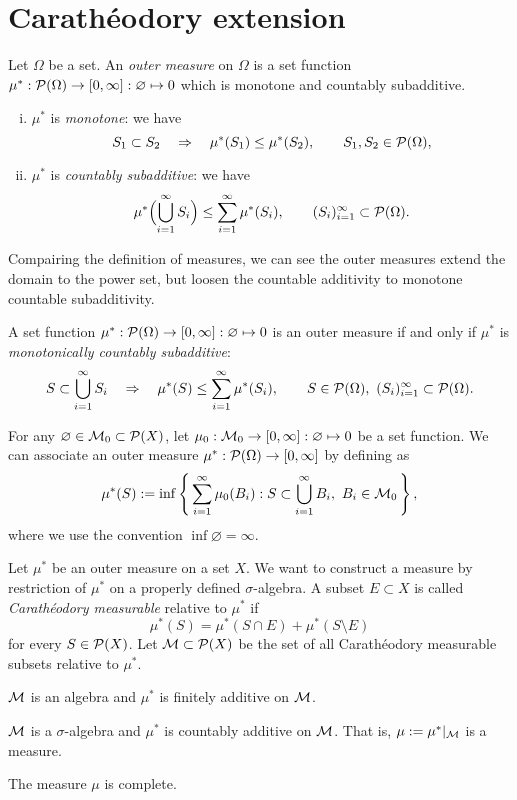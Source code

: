 \documentclass{../../large}
\begin{document}
\section{Carath\'eodory extension}

\begin{prb}
Let $\Omega$ be a set.
An \emph{outer measure} on $\Omega$ is a set function $\mu^*:\mathcal{P}(\Omega)\to[0,\infty]:\varnothing\mapsto0$ which is monotone and countably subadditive.
\begin{enumerate}[(i)]
\item $\mu^*$ is \emph{monotone}: we have
\[S_1\subset S_2\quad\Rightarrow\quad\mu^*(S_1)\le\mu^*(S_2),\qquad S_1,S_2\in\mathcal{P}(\Omega),\]
\item $\mu^*$ is \emph{countably subadditive}: we have
\[\mu^*\Bigl(\bigcup_{i=1}^\infty S_i\Bigr)\le\sum_{i=1}^\infty\mu^*(S_i),\qquad (S_i)_{i=1}^\infty\subset\mathcal{P}(\Omega).\]
\end{enumerate}
Compairing the definition of measures, we can see the outer measures extend the domain to the power set, but loosen the countable additivity to monotone countable subadditivity.
\begin{parts}
\item A set function $\mu^*:\mathcal{P}(\Omega)\to[0,\infty]:\varnothing\mapsto0$ is an outer measure if and only if $\mu^*$ is \emph{monotonically countably subadditive}:
\[S\subset\bigcup_{i=1}^\infty S_i\quad\Rightarrow\quad\mu^*(S)\le\sum_{i=1}^\infty\mu^*(S_i),\qquad S\in\mathcal{P}(\Omega),\ (S_i)_{i=1}^\infty\subset\mathcal{P}(\Omega).\]
\item
For any $\varnothing\in\mathcal{M}_0\subset\mathcal{P}(X)$, let $\mu_0:\mathcal{M}_0\to[0,\infty]:\varnothing\mapsto0$ be a set function.
We can associate an outer measure $\mu^*:\mathcal{P}(\Omega)\to[0,\infty]$ by defining as
\[\mu^*(S):=\inf\left\{\,\sum_{i=1}^\infty\mu_0(B_i):S\subset\bigcup_{i=1}^\infty B_i,\ B_i\in\mathcal{M}_0\,\right\},\]
where we use the convention $\inf\varnothing=\infty$.
\end{parts}
\end{prb}
\begin{pf}
\end{pf}


\begin{prb}
Let $\mu^*$ be an outer measure on a set $X$.
We want to construct a measure by restriction of $\mu^*$ on a properly defined $\sigma$-algebra.
A subset $E\subset X$ is called \emph{Carath\'eodory measurable} relative to $\mu^*$ if
\[\mu^*(S)=\mu^*(S\cap E)+\mu^*(S\setminus E)\]
for every $S\in\mathcal{P}(X)$.
Let $\mathcal{M}\subset\mathcal{P}(X)$ be the set of all Carath\'eodory measurable subsets relative to $\mu^*$.
\begin{parts}
\item $\mathcal{M}$ is an algebra and $\mu^*$ is finitely additive on $\mathcal{M}$.
\item $\mathcal{M}$ is a $\sigma$-algebra and $\mu^*$ is countably additive on $\mathcal{M}$. That is, $\mu:=\mu^*|_{\mathcal{M}}$ is a measure.
\item The measure $\mu$ is complete.
\end{parts}
\end{prb}
\begin{pf}
\end{pf}
\end{document}
